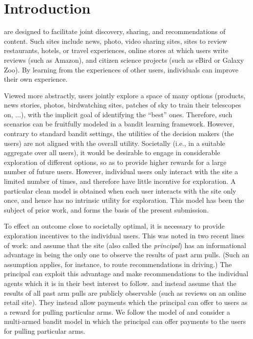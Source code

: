 \section{Introduction}

 are designed to facilitate joint discovery,
sharing, and recommendations of content.
Such sites include news, photo,  video sharing sites,
sites to review restaurants, hotels, or travel experiences,
online stores at which users write reviews (such as Amazon),
and citizen science projects
(such as eBird \citep{sullivan2009ebird} or Galaxy Zoo).
By learning from the experiences of other users, individuals can improve their own experience.

Viewed more abstractly, users jointly explore a space of
many options (products, news stories, photos, birdwatching sites,
patches of sky to train their telescopes on, $\ldots$),
with the implicit goal of identifying the ``best'' ones.
Therefore, such scenarios can be fruitfully modeled in a bandit
learning framework.
However, contrary to standard bandit settings, the utilities of the
decision makers (the users) are not aligned with the overall utility.
Societally (i.e., in a suitable aggregate over all users),
it would be desirable to engage in considerable exploration of
different options, so as to provide higher rewards for a large number
of future users.
However, individual users only interact with the site a limited number
of times, and therefore have little incentive for exploration.
A particular clean model is obtained when each user interacts with the
site only once, and hence has no intrinsic utility for exploration. 
This model has been the subject of prior work, and forms the basis of
the present submission.

To effect an outcome close to societally optimal,
it is necessary to provide exploration incentives to the individual users.
This was noted in two recent lines of work:
\citet{kremer2014implementing}
and \citet{mansour2015bayesian,mansour2016bayesian}
assume that the site (also called the \emph{principal}) has an
informational advantage in being the only one to observe the results
of past arm pulls.
(Such an assumption applies, for instance, to route recommendations in
driving.)
The principal can exploit this advantage and make recommendations to
the individual agents which it is in their best interest to follow.
\citet{frazier2014incentivizing} and 
\citet{han2015incentivizing} instead assume that the results of all
past arm pulls are publicly observable
(such as reviews on an online retail site).
They instead allow payments which the principal can offer to users as
a reward for pulling particular arms.
We follow the model of \citet{frazier2014incentivizing,han2015incentivizing}
and consider a multi-armed bandit model in which the principal can
offer payments to the users for pulling particular arms.

